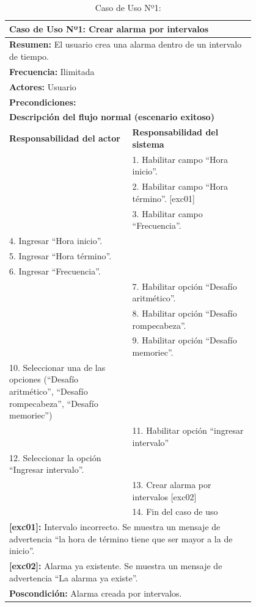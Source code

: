 \begin{table}[H]
    \centering
    \caption{Caso de Uso Nº1: }
    \begin{tabular}{| p{0.4\linewidth} | p{0.4\linewidth} |}
        \hline
        \multicolumn{2}{|l|}{\textbf{Caso de Uso Nº1:}  Crear alarma por intervalos} \\
        \hline
        \multicolumn{2}{|l|}{\textbf{Resumen:}  El usuario crea una alarma dentro de un intervalo de tiempo.} \\
        \hline
        \multicolumn{2}{|l|}{\textbf{Frecuencia:}  Ilimitada} \\
        \hline
        \multicolumn{2}{|l|}{\textbf{Actores:}  Usuario} \\
        \hline
        \multicolumn{2}{|l|}{\textbf{Precondiciones:}} \\
        \hline
        \multicolumn{2}{|l|}{\textbf{Descripción del flujo normal (escenario exitoso)} } \\
        \hline
        \textbf{Responsabilidad del actor} & \textbf{Responsabilidad del sistema}\\
         & 1. Habilitar campo “Hora inicio”.\\
         & 2. Habilitar campo “Hora término”. [exc01]\\
         & 3. Habilitar campo “Frecuencia”. \\
         4. Ingresar “Hora inicio”. \\
         5. Ingresar “Hora término”. \\
        6. Ingresar “Frecuencia”. \\ & 7. Habilitar opción “Desafío aritmético”.\\
         & 8. Habilitar opción “Desafío rompecabeza”.\\
         & 9. Habilitar opción “Desafío memoriec”.\\
        10. Seleccionar una de las opciones (“Desafío aritmético”, “Desafío rompecabeza”, “Desafío memoriec”) & \\
         & 11. Habilitar opción “ingresar intervalo”\\
        12. Seleccionar la opción “Ingresar intervalo”.\\
         & 13. Crear alarma por intervalos [exc02]\\
         & 14. Fin del caso de uso \\
        \hline
        \multicolumn{2}{|p{0.8\linewidth}|}{\textbf{[exc01]:} Intervalo incorrecto. Se muestra un mensaje de advertencia “la hora de término tiene que ser mayor a la de inicio”.} \\
        \multicolumn{2}{|p{0.8\linewidth}|}{\textbf{[exc02]:} Alarma ya existente. Se muestra un mensaje de advertencia “La alarma ya existe”.} \\
        \hline
        \multicolumn{2}{|l|}{\textbf{Poscondición:}  Alarma creada por intervalos.} \\
        \hline
    
    \end{tabular}    
    
    \label{table:1}
\end{table}

